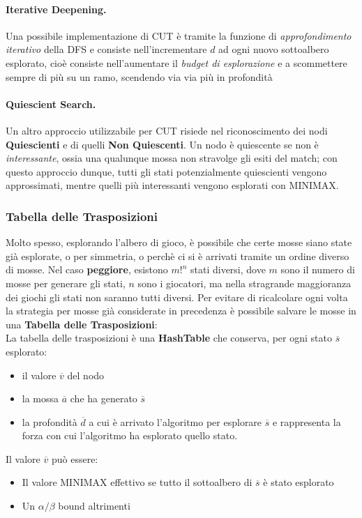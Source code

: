 \paragraph{Iterative Deepening.} Una possibile implementazione di CUT è tramite la funzione di \textit{approfondimento iterativo} della DFS e consiste nell'incrementare $d$
ad ogni nuovo sottoalbero esplorato, cioè consiste nell'aumentare il \textit{budget di esplorazione} e a scommettere sempre di più su un ramo, scendendo via via più in profondità

\paragraph{Quiescient Search.} Un altro approccio utilizzabile per CUT risiede nel riconoscimento dei nodi \textbf{Quiescienti} e di quelli \textbf{Non Quiescenti}.
Un nodo è quiescente se non è \textit{interessante}, ossia una qualunque mossa non stravolge gli esiti del match; con questo approccio dunque, tutti gli stati potenzialmente quiescienti vengono approssimati,
mentre quelli più interessanti vengono esplorati con MINIMAX.


\subsubsection{Tabella delle Trasposizioni}
Molto spesso, esplorando l'albero di gioco, è possibile che certe mosse siano state già esplorate, o per simmetria, o perchè
ci si è arrivati tramite un ordine diverso di mosse. Nel caso \textbf{peggiore}, esistono $m!^n$ stati diversi, dove
$m$ sono il numero di mosse per generare gli stati, $n$ sono i giocatori, ma nella stragrande maggioranza dei giochi
gli stati non saranno tutti diversi. Per evitare di ricalcolare ogni volta la strategia per mosse già considerate in precedenza
è possibile salvare le mosse in una \textbf{Tabella delle Trasposizioni}:\\
La tabella delle trasposizioni è una \textbf{HashTable} che conserva, per ogni stato $\overline{s}$ esplorato:
\begin{itemize}
    \item il valore $\overline{v}$ del nodo
    \item la mossa $\overline{a}$ che ha generato $\overline{s}$
    \item la profondità $\overline{d}$ a cui è arrivato l'algoritmo per esplorare $\overline{s}$ e rappresenta la forza con cui
    l'algoritmo ha esplorato quello stato.
\end{itemize}
Il valore $\overline{v}$ può essere:
\begin{itemize}
    \item Il valore MINIMAX effettivo se tutto il sottoalbero di $\overline{s}$ è stato esplorato
    \item Un $\alpha/ \beta$ bound altrimenti
\end{itemize}


